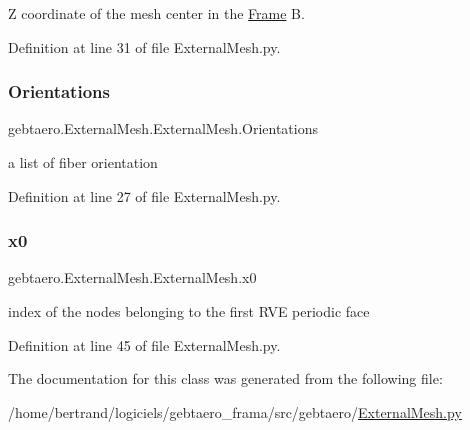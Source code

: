 Z coordinate of the mesh center in the \hyperlink{namespacegebtaero_1_1_frame}{Frame} B. 



Definition at line 31 of file External\+Mesh.\+py.

\mbox{\label{classgebtaero_1_1_external_mesh_1_1_external_mesh_a531dc1641becd6ea9cc5225ddfea8752}} 
\subsubsection{\texorpdfstring{Orientations}{Orientations}}
{\footnotesize\ttfamily gebtaero.\+External\+Mesh.\+External\+Mesh.\+Orientations}



a list of fiber orientation 



Definition at line 27 of file External\+Mesh.\+py.

\mbox{\label{classgebtaero_1_1_external_mesh_1_1_external_mesh_acaa3b125cb4f80848007b82426c14ffa}} 
\subsubsection{\texorpdfstring{x0}{x0}}
{\footnotesize\ttfamily gebtaero.\+External\+Mesh.\+External\+Mesh.\+x0}



index of the nodes belonging to the first R\+VE periodic face 



Definition at line 45 of file External\+Mesh.\+py.



The documentation for this class was generated from the following file\+:\begin{DoxyCompactItemize}
\item 
/home/bertrand/logiciels/gebtaero\+\_\+frama/src/gebtaero/\hyperlink{_external_mesh_8py}{External\+Mesh.\+py}\end{DoxyCompactItemize}
